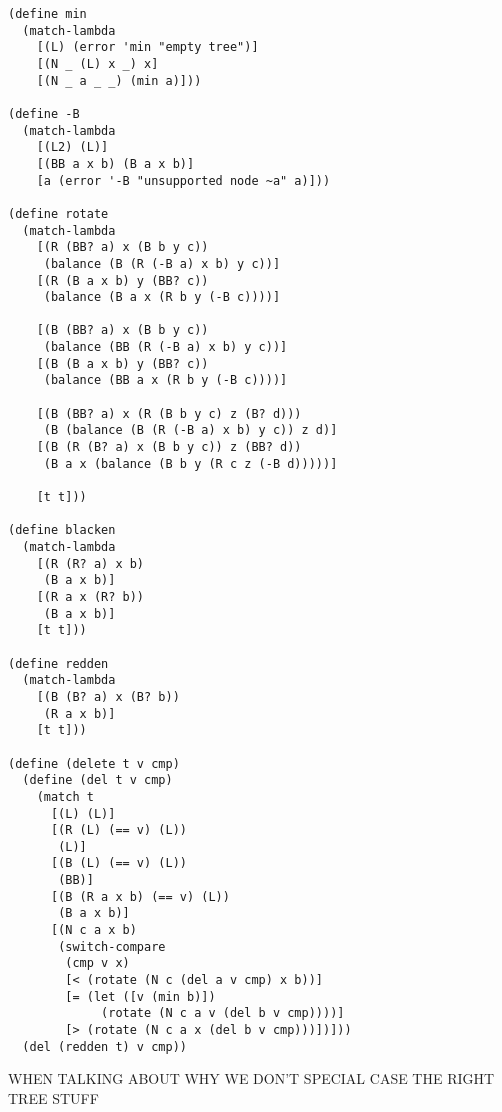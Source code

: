 \documentclass[preprint]{sigplanconf}
\begin{document}
\begin{verbatim}
(define min
  (match-lambda
    [(L) (error 'min "empty tree")]
    [(N _ (L) x _) x]
    [(N _ a _ _) (min a)]))

(define -B
  (match-lambda
    [(L2) (L)]
    [(BB a x b) (B a x b)]
    [a (error '-B "unsupported node ~a" a)]))

(define rotate
  (match-lambda
    [(R (BB? a) x (B b y c))
     (balance (B (R (-B a) x b) y c))]
    [(R (B a x b) y (BB? c))
     (balance (B a x (R b y (-B c))))]
    
    [(B (BB? a) x (B b y c))
     (balance (BB (R (-B a) x b) y c))]
    [(B (B a x b) y (BB? c))
     (balance (BB a x (R b y (-B c))))]
    
    [(B (BB? a) x (R (B b y c) z (B? d)))
     (B (balance (B (R (-B a) x b) y c)) z d)]
    [(B (R (B? a) x (B b y c)) z (BB? d))
     (B a x (balance (B b y (R c z (-B d)))))]
    
    [t t]))

(define blacken
  (match-lambda
    [(R (R? a) x b)
     (B a x b)]
    [(R a x (R? b))
     (B a x b)]
    [t t]))

(define redden
  (match-lambda
    [(B (B? a) x (B? b))
     (R a x b)]
    [t t]))

(define (delete t v cmp)
  (define (del t v cmp)
    (match t
      [(L) (L)]
      [(R (L) (== v) (L))
       (L)]
      [(B (L) (== v) (L))
       (BB)]
      [(B (R a x b) (== v) (L))
       (B a x b)]
      [(N c a x b)
       (switch-compare
        (cmp v x)
        [< (rotate (N c (del a v cmp) x b))]
        [= (let ([v (min b)])
             (rotate (N c a v (del b v cmp))))]
        [> (rotate (N c a x (del b v cmp)))])]))
  (del (redden t) v cmp))
\end{verbatim}

WHEN TALKING ABOUT WHY WE DON'T SPECIAL CASE THE RIGHT TREE STUFF
\end{document}
